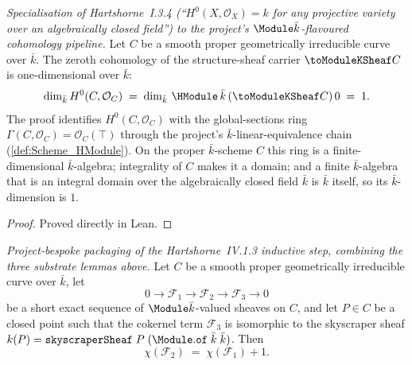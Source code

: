 \begin{lemma}
  \label{lem:finrank_H0_toModuleKSheaf_eq_one}
  \textit{Specialisation of Hartshorne~I.3.4 (``\(H^0(X, \mathcal O_X) = k\)
  for any projective variety over an algebraically closed field'') to the
  project's \(\Module \bar k\)-flavoured cohomology pipeline.}
  Let \(C\) be a smooth proper geometrically irreducible curve over
  \(\bar k\). The zeroth cohomology of the structure-sheaf carrier
  \(\toModuleKSheaf C\) is one-dimensional over \(\bar k\):
  \[
    \dim_{\bar k} H^0(C, \mathcal O_C)
    \;=\; \dim_{\bar k}\, \HModule\,\bar k\,(\toModuleKSheaf C)\,0
    \;=\; 1.
  \]
  The proof identifies \(H^0(C, \mathcal O_C)\) with the global-sections
  ring \(\Gamma(C, \mathcal O_C) = \mathcal O_C(\top)\) through the
  project's \(\bar k\)-linear-equivalence chain
  (\cref{def:Scheme_HModule}). On the proper \(\bar k\)-scheme \(C\) this
  ring is a finite-dimensional \(\bar k\)-algebra; integrality of \(C\)
  makes it a domain; and a finite \(\bar k\)-algebra that is an integral
  domain over the algebraically closed field \(\bar k\) is \(\bar k\)
  itself, so its \(\bar k\)-dimension is \(1\).
\end{lemma}

\begin{proof}
  Proved directly in Lean.
\end{proof}

\begin{lemma}
  \label{lem:euler_char_of_shortExact_skyscraper}
  \textit{Project-bespoke packaging of the Hartshorne~IV.1.3 inductive
  step, combining the three substrate lemmas above.}
  Let \(C\) be a smooth proper geometrically irreducible curve over
  \(\bar k\), let
  \[
    0 \to \mathcal F_1 \to \mathcal F_2 \to \mathcal F_3 \to 0
  \]
  be a short exact sequence of \(\Module \bar k\)-valued sheaves on
  \(C\), and let \(P \in C\) be a closed point such that the cokernel
  term \(\mathcal F_3\) is isomorphic to the skyscraper sheaf
  \(k(P) = \mathtt{skyscraperSheaf}\;P\;(\Module.\mathtt{of}\;\bar k\;\bar k)\).
  Then
  \[
    \chi(\mathcal F_2) \;=\; \chi(\mathcal F_1) + 1.
  \]
\end{lemma}

